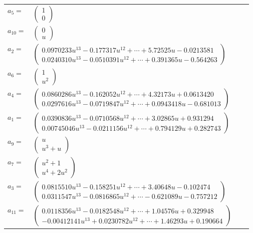 \documentclass[1p]{elsarticle_modified}
\theoremstyle{definition}
\begin{document}
\begin{tabular}{m{7pt} m{180pt} m{7pt} m{180pt} }
\flushright $a_{5}=$&$\begin{pmatrix}1\\0\end{pmatrix}$ \\
\flushright $a_{10}=$&$\begin{pmatrix}0\\u\end{pmatrix}$ \\
\flushright $a_{2}=$&$\begin{pmatrix}0.0970233 u^{13}-0.177317 u^{12}+\cdots+5.72525 u-0.0213581\\0.0240310 u^{13}-0.0510391 u^{12}+\cdots+0.391365 u-0.564263\end{pmatrix}$ \\
\flushright $a_{6}=$&$\begin{pmatrix}1\\u^2\end{pmatrix}$ \\
\flushright $a_{4}=$&$\begin{pmatrix}0.0860286 u^{13}-0.162052 u^{12}+\cdots+4.32173 u+0.0613420\\0.0297616 u^{13}-0.0719847 u^{12}+\cdots+0.0943418 u-0.681013\end{pmatrix}$ \\
\flushright $a_{1}=$&$\begin{pmatrix}0.0390836 u^{13}-0.0710568 u^{12}+\cdots+3.02865 u+0.931294\\0.00745046 u^{13}-0.0211156 u^{12}+\cdots+0.794129 u+0.282743\end{pmatrix}$ \\
\flushright $a_{9}=$&$\begin{pmatrix}u\\u^3+u\end{pmatrix}$ \\
\flushright $a_{7}=$&$\begin{pmatrix}u^2+1\\u^4+2 u^2\end{pmatrix}$ \\
\flushright $a_{3}=$&$\begin{pmatrix}0.0815510 u^{13}-0.158251 u^{12}+\cdots+3.40648 u-0.102474\\0.0311547 u^{13}-0.0816865 u^{12}+\cdots-0.621089 u-0.757212\end{pmatrix}$ \\
\flushright $a_{11}=$&$\begin{pmatrix}0.0118356 u^{13}-0.0182548 u^{12}+\cdots+1.04576 u+0.329948\\-0.00412141 u^{13}+0.0230782 u^{12}+\cdots+1.46293 u+0.190664\end{pmatrix}$ \\

\end{tabular}
\end{document}
